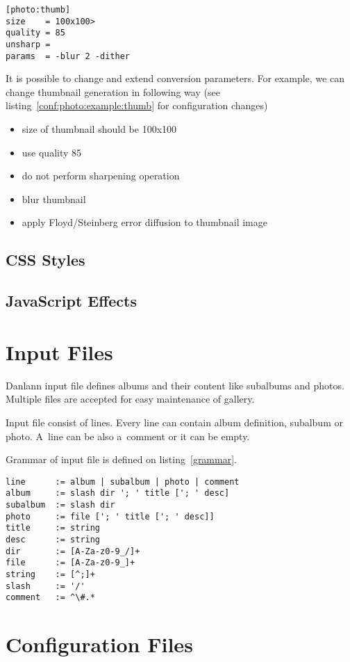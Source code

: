 \documentclass{article}
\begin{document}
\begin{listing}
\begin{lstlisting}
[photo:thumb]
size    = 100x100>
quality = 85
unsharp =
params  = -blur 2 -dither
\end{lstlisting}
\caption{Example of custom photo conversion parameters}\label{conf:photo:example:thumb}
\end{listing}

It is possible to change and extend conversion parameters. For example, we
can change thumbnail generation in following way (see
listing~\ref{conf:photo:example:thumb} for configuration changes)
\begin{itemize}
\item size of thumbnail should be 100x100
\item use quality 85
\item do not perform sharpening operation
\item blur thumbnail 
\item apply Floyd/Steinberg error diffusion to thumbnail image
\end{itemize}

\subsection{CSS Styles}

\subsection{JavaScript Effects}

\section{Input Files}
Danlann input file defines albums and their content like subalbums and
photos. Multiple files are accepted for easy maintenance of gallery.

Input file consist of lines. Every line can contain album definition,
subalbum or photo. A~line can be also a~comment or it can be empty.

Grammar of input file is defined on listing~\ref{grammar}.

\begin{listing}
\begin{lstlisting}
line      := album | subalbum | photo | comment
album     := slash dir '; ' title ['; ' desc]
subalbum  := slash dir
photo     := file ['; ' title ['; ' desc]]
title     := string
desc      := string
dir       := [A-Za-z0-9_/]+
file      := [A-Za-z0-9_]+
string    := [^;]+
slash     := '/'
comment   := ^\#.*
\end{lstlisting}
\caption{Grammar of input files}\label{grammar}
\end{listing}


\section{Configuration Files}
\end{document}
